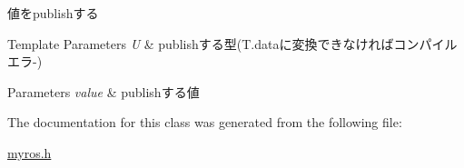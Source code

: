 値をpublishする 


\begin{DoxyTemplParams}{Template Parameters}
{\em U} & publishする型(T.\-dataに変換できなければコンパイルエラ-\/) \\
\hline
\end{DoxyTemplParams}

\begin{DoxyParams}{Parameters}
{\em value} & publishする値 \\
\hline
\end{DoxyParams}


The documentation for this class was generated from the following file\-:\begin{DoxyCompactItemize}
\item 
\hyperlink{myros_8h}{myros.\-h}\end{DoxyCompactItemize}

